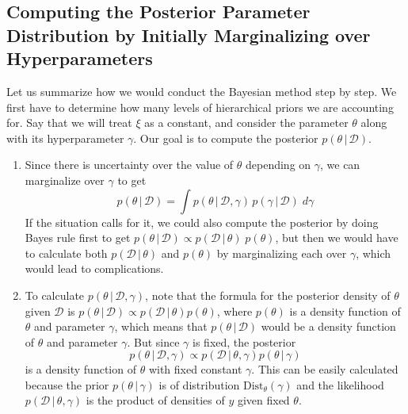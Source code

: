 \documentclass{article}
\begin{document}
  \subsection{Computing the Posterior Parameter Distribution by Initially Marginalizing over Hyperparameters}

    Let us summarize how we would conduct the Bayesian method step by step. We first have to determine how many levels of hierarchical priors we are accounting for. Say that we will treat $\xi$ as a constant, and consider the parameter $\theta$ along with its hyperparameter $\gamma$. Our goal is to compute the posterior $p(\theta\,|\,\mathcal{D})$.

    \begin{enumerate}
      \item Since there is uncertainty over the value of $\theta$ depending on $\gamma$, we can marginalize over $\gamma$ to get
      \begin{equation}
        p(\theta\,|\,\mathcal{D}) = \int p(\theta\,|\,\mathcal{D}, \gamma)\, p(\gamma\,|\,\mathcal{D})\; d\gamma
      \end{equation}
      If the situation calls for it, we could also compute the posterior by doing Bayes rule first to get $p(\theta\,|\,\mathcal{D}) \propto p(\mathcal{D}\,|\,\theta)\; p(\theta)$, but then we would have to calculate both $p(\mathcal{D}\,|\,\theta)$ and $p(\theta)$ by marginalizing each over $\gamma$, which would lead to complications.

      \item To calculate $p(\theta\,|\,\mathcal{D}, \gamma)$, note that the formula for the posterior density of $\theta$ given $\mathcal{D}$ is $p(\theta\,|\,\mathcal{D}) \propto p(\mathcal{D}\,|\,\theta) p(\theta)$, where $p(\theta)$ is a density function of $\theta$ and parameter $\gamma$, which means that $p(\theta\,|\,\mathcal{D})$ would be a density function of $\theta$ and parameter $\gamma$. But since $\gamma$ is fixed, the posterior
      \begin{equation}
        p(\theta\,|\,\mathcal{D}, \gamma) \propto p(\mathcal{D}\,|\,\theta, \gamma) p(\theta\,|\,\gamma)
      \end{equation}
      is a density function of $\theta$ with fixed constant $\gamma$. This can be easily calculated because the prior $p(\theta\,|\,\gamma)$ is of distribution $\text{Dist}_\theta (\gamma)$ and the likelihood $p(\mathcal{D}\,|\,\theta, \gamma)$ is the product of densities of $y$ given fixed $\theta$.


\end{enumerate}
\end{document}
